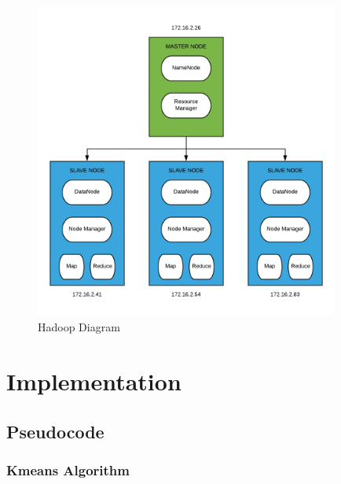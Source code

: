 \documentclass{book}
\begin{document}
    \begin{figure}[H]
        \includegraphics[width=10cm]{Hadoop-Diagram}
        \centering
        \caption{Hadoop Diagram}
    \end{figure}
   
\chapter{Implementation}\label{chap:implementation}
    
    \section{Pseudocode}
    \paragraph{}

    \clearpage
    \subsection{Kmeans Algorithm}
    \paragraph{}
\end{document}
